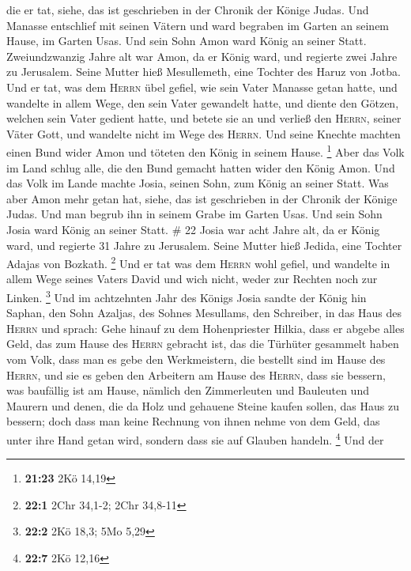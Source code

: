 die er tat, siehe, das ist geschrieben in der Chronik der Könige Judas.
 Und Manasse entschlief mit seinen Vätern und ward
begraben im Garten an seinem Hause, im Garten Usas. Und sein Sohn Amon
ward König an seiner Statt.  Zweiundzwanzig Jahre alt war
Amon, da er König ward, und regierte zwei Jahre zu Jerusalem. Seine
Mutter hieß Mesullemeth, eine Tochter des Haruz von Jotba.
 Und er tat, was dem \textsc{Herrn} übel gefiel, wie sein
Vater Manasse getan hatte,  und wandelte in allem Wege,
den sein Vater gewandelt hatte, und diente den Götzen, welchen sein
Vater gedient hatte, und betete sie an  und verließ den
\textsc{Herrn}, seiner Väter Gott, und wandelte nicht im Wege des
\textsc{Herrn}.  Und seine Knechte machten einen Bund
wider Amon und töteten den König in seinem Hause. \footnote{\textbf{21:23}
  2Kö 14,19}  Aber das Volk im Land schlug alle, die den
Bund gemacht hatten wider den König Amon. Und das Volk im Lande machte
Josia, seinen Sohn, zum König an seiner Statt.  Was aber
Amon mehr getan hat, siehe, das ist geschrieben in der Chronik der
Könige Judas.  Und man begrub ihn in seinem Grabe im
Garten Usas. Und sein Sohn Josia ward König an seiner Statt. \# 22
 Josia war acht Jahre alt, da er König ward, und regierte
31 Jahre zu Jerusalem. Seine Mutter hieß Jedida, eine Tochter Adajas von
Bozkath. \footnote{\textbf{22:1} 2Chr 34,1-2; 2Chr 34,8-11}
 Und er tat was dem \textsc{Herrn} wohl gefiel, und
wandelte in allem Wege seines Vaters David und wich nicht, weder zur
Rechten noch zur Linken. \footnote{\textbf{22:2} 2Kö 18,3; 5Mo 5,29}
 Und im achtzehnten Jahr des Königs Josia sandte der König
hin Saphan, den Sohn Azaljas, des Sohnes Mesullams, den Schreiber, in
das Haus des \textsc{Herrn} und sprach:  Gehe hinauf zu
dem Hohenpriester Hilkia, dass er abgebe alles Geld, das zum Hause des
\textsc{Herrn} gebracht ist, das die Türhüter gesammelt haben vom Volk,
 dass man es gebe den Werkmeistern, die bestellt sind im
Hause des \textsc{Herrn}, und sie es geben den Arbeitern am Hause des
\textsc{Herrn}, dass sie bessern, was baufällig ist am Hause,
 nämlich den Zimmerleuten und Bauleuten und Maurern und
denen, die da Holz und gehauene Steine kaufen sollen, das Haus zu
bessern;  doch dass man keine Rechnung von ihnen nehme von
dem Geld, das unter ihre Hand getan wird, sondern dass sie auf Glauben
handeln. \footnote{\textbf{22:7} 2Kö 12,16}  Und der
